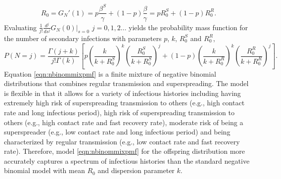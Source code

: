 \documentclass{imammb}
\numberwithin{equation}{section}
\begin{document}
\begin{equation}
   R_0= G_N'(1) = p\frac{ \beta^S }{\gamma } +(1-p)\frac{ \beta }  {\gamma  } = p R_0^S + (1-p) R_0^R.%
\end{equation}
Evaluating $\frac{1}{j!} \frac{d^j}{ds^j} G_N(0) |_{s=0}$ $j=0,1,2\dots$ yields the probability mass function for the number of secondary infections with parameters $p$, $k$, $R_0^S$ and $R_0^R$,
\begin{equation}\label{eqn:nbinommixpmf}
    P(N=j) =  \frac{\Gamma(j+k)}{j! \Gamma (k)} \left [ p \left(\frac{k}{k+R_0^S} \right)^{k}\left (\frac{R_0^S}{k+R_0^S} \right )^j+ (1-p) \left(\frac{k}{k+R_0^R} \right)^{k}\left (\frac{R_0^R}{k+R_0^R} \right )^j \right ].
\end{equation}
Equation \eqref{eqn:nbinommixpmf} is a finite mixture of negative binomial distributions that combines regular transmission and superspreading. %
The model is flexible in that it allows for a variety of infectious histories including having extremely high risk of superspreading transmission to others (e.g., high contact rate and long infectious period), high risk of superspreading transmission to others (e.g., high contact rate and fast recovery rate), moderate risk of being a superspreader (e.g., low contact rate and long infectious period) and being characterized by regular transmission (e.g., low contact rate and fast recovery rate). Therefore, model \eqref{eqn:nbinommixpmf} for the offspring distribution more accurately captures a spectrum of infectious histories than the standard negative binomial model with mean $R_0$ and dispersion parameter $k$. 

\end{document}
